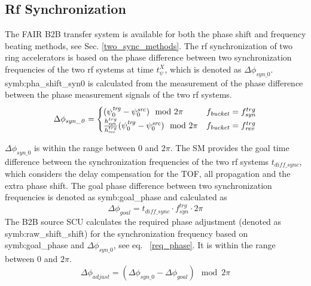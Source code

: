 \subsection{Rf Synchronization}
The FAIR B2B transfer system is available for both the phase shift and frequency beating methods, see Sec. \ref{two_sync_methods}. The rf synchronization of two ring accelerators is based on the phase difference between two synchronization frequencies of the two rf systems at time $t_\psi^X$, which is denoted as $\Delta \phi_\mathit{syn\_0}$. \gls{symb:pha_shift_syn0} is calculated from the measurement of the phase difference between the phase measurement signals of the two rf systems. 
\begin{eqnarray}
\label{phase_shift_syn}
\Delta \phi_\mathit{syn\_0}=
\begin{cases}
(\psi^\mathit{trg}_0-\psi^\mathit{src}_0) \mod 2\pi
&f_{\mathit{bucket}}=f_{\mathit{syn}}^{trg}\cr

\frac{h_{\mathit{syn}}^{trg}}{h_{\mathit{rev}}^{trg}}(\psi^\mathit{trg}_0-\psi^\mathit{src}_0) \mod 2\pi
&f_{\mathit{bucket}}=f_{\mathit{rev}}^{trg}
\end{cases}
\end{eqnarray}

$\Delta \phi_\mathit{syn\_0}$ is within the range between $0$ and $2\pi$. The SM provides the goal time difference between the synchronization frequencies of the two rf systems $t_{\mathit{diff\_sync}}$, which considers the delay compensation for the TOF, all propagation and the extra phase shift. The goal phase difference between two synchronization frequencies is denoted as \gls{symb:goal_phase} and calculated as 
\begin{equation}
\Delta \phi_\mathit{goal}= t_{\mathit{diff\_sync}}  \cdot f_\mathit{syn}^\mathit{trg}\cdot 2\pi 
\end{equation}
The B2B source SCU calculates the required phase adjustment (denoted as \gls{symb:raw_shift_shift}) for the synchronization frequency based on \gls{symb:goal_phase} and $\Delta \phi_\mathit{syn\_0}$, see eq. ~\ref{req_phase}. It is within the range between $0$ and $2\pi$.
\begin{equation}
\Delta \phi_\mathit{adjust}= (\Delta \phi_\mathit{syn\_0}-\Delta \phi_\mathit{goal}) \mod 2\pi 
\label{req_phase}
\end{equation}


